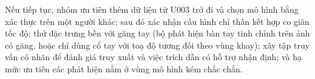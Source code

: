 Nếu tiếp tục, nhóm ưu tiên thêm dữ liệu từ U003 trở đi và chọn mô hình bằng xác thực trên một người khác; sau đó xác nhận cấu hình chỉ thân kết hợp co giãn tốc độ; thử đặc trưng bền với găng tay (bộ phát hiện bàn tay tinh chỉnh trên ảnh có găng, hoặc chỉ dùng cổ tay với toạ độ tương đối theo vùng khay); xây tập truy vấn có nhãn để đánh giá truy xuất và việc trích dẫn có hỗ trợ nhận định; và hạ mức ưu tiên các phát hiện nằm ở vùng mô hình kém chắc chắn.
